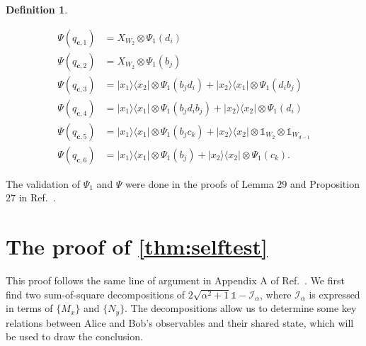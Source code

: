\documentclass[11pt,letterpaper]{article}
\newcommand{\ketbra}[2]{|#1\rangle\langle#2|}
\newcommand{\x}{\otimes}
\newcommand{\1}{\mathbb{1}}
\newcommand{\bc}{\pmb{c}}
\newcommand{\I}{\mathcal{I}}
\newtheorem{definition}[theorem]{Definition}
\theoremstyle{definition}
\begin{document}
\begin{definition}
\begin{itemize}
\begin{align*}
	\Psi(q_{\bc, 1}) &= X_{W_2} \x \Psi_1(d_i) \\
	\Psi(q_{\bc, 2}) &= X_{W_2} \x \Psi_1(b_j) \\
	\Psi(q_{\bc, 3}) &= \ketbra{x_1}{x_2} \x  \Psi_1(b_jd_i) + \ketbra{x_2}{x_1} \x \Psi_1(d_ib_j)\\
	\Psi(q_{\bc, 4}) &= \ketbra{x_1}{x_1} \x \Psi_1(b_jd_ib_j) + \ketbra{x_2}{x_2} \x  \Psi_1(d_i)\\
	\Psi(q_{\bc, 5}) &=  \ketbra{x_1}{x_1} \x \Psi_1(b_jc_k) + \ketbra{x_2}{x_2} \x \1_{W_2} \x \1_{W_{d-1}}\\
	\Psi(q_{\bc, 6}) &= \ketbra{x_1}{x_1} \x \Psi_1(b_j) + \ketbra{x_2}{x_2} \x \Psi_1(c_{k}).
\end{align*}
\end{itemize}
\end{definition}
The validation of $\Psi_1$ and $\Psi$ were done in the proofs of 
Lemma $29$ and Proposition $27$ in Ref.~\cite{slofstra2017}.
\section{The proof of \cref{thm:selftest} }
\label{sec:selftest}
This proof follows the same line of argument in Appendix A of Ref.~\cite{bamps2015}.
We first find two sum-of-square decompositions of $2\sqrt{\alpha^2+1} \1 - \I_\alpha$,
where $\I_\alpha$ is expressed in terms of $\{M_x\}$ and $\{N_y\}$.
The decompositions allow us to determine some key relations between Alice and Bob's observables
and their shared state, which will be used to draw the conclusion.
\end{document}
